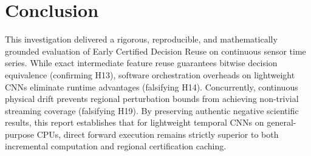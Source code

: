 \documentclass[10pt,twocolumn]{article}
\begin{document}
\section{Conclusion}
This investigation delivered a rigorous, reproducible, and mathematically grounded evaluation of Early Certified Decision Reuse on continuous sensor time series. While exact intermediate feature reuse guarantees bitwise decision equivalence (confirming H13), software orchestration overheads on lightweight CNNs eliminate runtime advantages (falsifying H14). Concurrently, continuous physical drift prevents regional perturbation bounds from achieving non-trivial streaming coverage (falsifying H19). By preserving authentic negative scientific results, this report establishes that for lightweight temporal CNNs on general-purpose CPUs, direct forward execution remains strictly superior to both incremental computation and regional certification caching.



\end{document}
